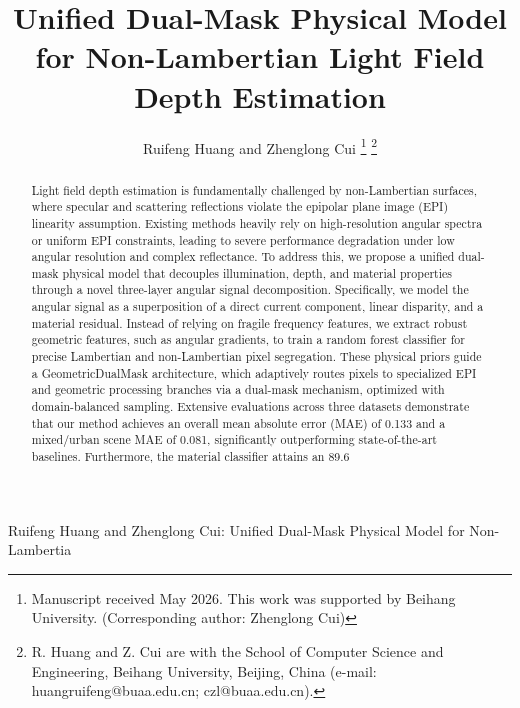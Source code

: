 \documentclass[lettersize,journal]{IEEEtran}
\begin{document}
\title{Unified Dual-Mask Physical Model for Non-Lambertian Light Field Depth Estimation}

\author{Ruifeng Huang and Zhenglong Cui
\thanks{Manuscript received May 2026. This work was supported by Beihang University. (Corresponding author: Zhenglong Cui)}
\thanks{R. Huang and Z. Cui are with the School of Computer Science and Engineering, Beihang University, Beijing, China (e-mail: huangruifeng@buaa.edu.cn; czl@buaa.edu.cn).}}

%
{Ruifeng Huang and Zhenglong Cui: Unified Dual-Mask Physical Model for Non-Lambertia}

\maketitle

\begin{abstract}
Light field depth estimation is fundamentally challenged by non-Lambertian surfaces, where specular and scattering reflections violate the epipolar plane image (EPI) linearity assumption. Existing methods heavily rely on high-resolution angular spectra or uniform EPI constraints, leading to severe performance degradation under low angular resolution and complex reflectance. To address this, we propose a unified dual-mask physical model that decouples illumination, depth, and material properties through a novel three-layer angular signal decomposition. Specifically, we model the angular signal as a superposition of a direct current component, linear disparity, and a material residual. Instead of relying on fragile frequency features, we extract robust geometric features, such as angular gradients, to train a random forest classifier for precise Lambertian and non-Lambertian pixel segregation. These physical priors guide a GeometricDualMask architecture, which adaptively routes pixels to specialized EPI and geometric processing branches via a dual-mask mechanism, optimized with domain-balanced sampling. Extensive evaluations across three datasets demonstrate that our method achieves an overall mean absolute error (MAE) of 0.133 and a mixed/urban scene MAE of 0.081, significantly outperforming state-of-the-art baselines. Furthermore, the material classifier attains an 89.6%
\end{abstract}
\end{document}

